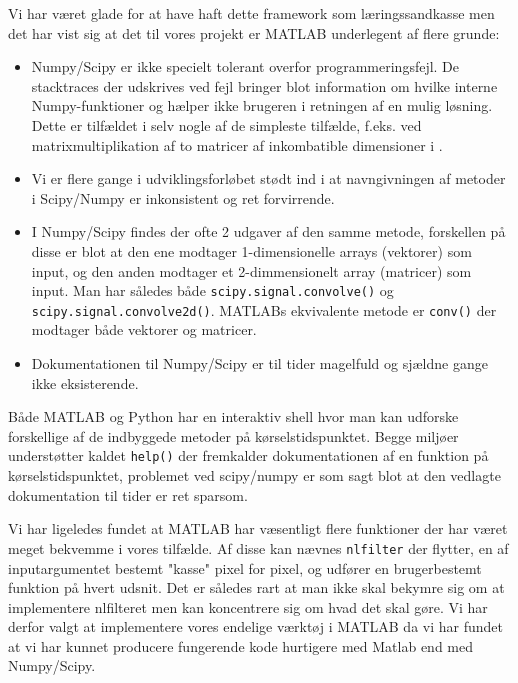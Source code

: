 Vi har været glade for at have haft dette framework som 
læringssandkasse men det har vist sig at det til vores projekt er MATLAB underlegent af flere grunde:
\begin{itemize}
	\item Numpy/Scipy er ikke specielt tolerant overfor programmeringsfejl. De stacktraces der udskrives ved fejl bringer blot information om hvilke interne Numpy-funktioner og hælper ikke brugeren i retningen af en mulig løsning. Dette er tilfældet i selv nogle af de simpleste tilfælde, f.eks. ved matrixmultiplikation af to matricer af inkombatible dimensioner i %
	.
	\item Vi er flere gange i udviklingsforløbet stødt ind i at navngivningen af metoder i Scipy/Numpy er inkonsistent og ret forvirrende. 
	\item I Numpy/Scipy findes der ofte 2 udgaver af den samme metode, forskellen på disse er blot at den ene modtager 1-dimensionelle arrays (vektorer) som input, og den anden modtager et 2-dimmensionelt array (matricer) som input. Man har således både \texttt{scipy.signal.convolve()} og \texttt{scipy.signal.convolve2d()}. MATLABs ekvivalente metode er \texttt{conv()} der modtager både vektorer og matricer.
	\item Dokumentationen til Numpy/Scipy er til tider magelfuld og sjældne gange ikke eksisterende. 
\end{itemize}

Både MATLAB og Python har en interaktiv shell hvor man kan udforske forskellige af de indbyggede metoder på kørselstidspunktet. Begge miljøer understøtter kaldet \texttt{help()} der fremkalder dokumentationen af en funktion på kørselstidspunktet, problemet ved scipy/numpy er som sagt blot at den vedlagte dokumentation til tider er ret sparsom.

Vi har ligeledes fundet at MATLAB har væsentligt flere funktioner der har været meget bekvemme i vores tilfælde. Af disse kan nævnes \texttt{nlfilter} der flytter, en af inputargumentet bestemt "kasse" pixel for pixel, og udfører en brugerbestemt funktion på hvert udsnit. Det er således rart at man ikke skal bekymre sig om at implementere nlfilteret men kan koncentrere sig om hvad det skal gøre. 
Vi har derfor valgt at implementere vores endelige værktøj i MATLAB da vi har fundet at vi har kunnet producere fungerende kode hurtigere med Matlab end med Numpy/Scipy. %
